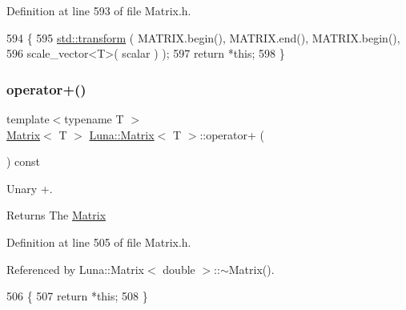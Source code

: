 Definition at line 593 of file Matrix.\+h.


\begin{DoxyCode}
594   \{
595     \hyperlink{namespaceHeat__plot_aeaa6785bedcad63b4bd40e8cb1bad8a0}{std::transform} ( MATRIX.begin(), MATRIX.end(), MATRIX.begin(),
596                      scale\_vector<T>( scalar ) );
597     \textcolor{keywordflow}{return} *\textcolor{keyword}{this};
598   \}
\end{DoxyCode}
\mbox{\label{classLuna_1_1Matrix_a0da8678a18ee0d774b6e52ea913fcda3}} 
\subsubsection{\texorpdfstring{operator+()}{operator+()}\hspace{0.1cm}{\footnotesize\ttfamily [1/2]}}
{\footnotesize\ttfamily template$<$typename T $>$ \\
\hyperlink{classLuna_1_1Matrix}{Matrix}$<$ T $>$ \hyperlink{classLuna_1_1Matrix}{Luna\+::\+Matrix}$<$ T $>$\+::operator+ (\begin{DoxyParamCaption}{ }\end{DoxyParamCaption}) const\hspace{0.3cm}{\ttfamily [inline]}}



Unary +. 

\begin{DoxyReturn}{Returns}
The \hyperlink{classLuna_1_1Matrix}{Matrix} 
\end{DoxyReturn}


Definition at line 505 of file Matrix.\+h.



Referenced by Luna\+::\+Matrix$<$ double $>$\+::$\sim$\+Matrix().


\begin{DoxyCode}
506   \{
507     \textcolor{keywordflow}{return} *\textcolor{keyword}{this};
508   \}
\end{DoxyCode}
\mbox{\label{classLuna_1_1Matrix_ac14dcb908c213e7b871191d9a97db649}} 
